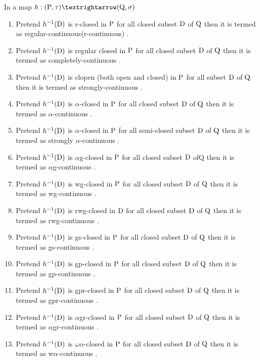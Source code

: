 \begin{dfn}\label{dfn1.3.1}
In a map $h: (\TSP, \tau) →(\TSQ, \sigma)$
\begin{enumerate}
\item Pretend $h^{-1}(\mathrm{D})$ is r-closed in $\mathrm{P}$ for all closed subset $\mathrm{D}$ of $\mathrm{Q}$ then it is termed as regular-continuous(r-continuous) \cite{key3} . 
\item Pretend $h^{-1}(\mathrm{D})$ is regular closed in $\mathrm{P}$ for all closed subset $\mathrm{D}$ of $\mathrm{Q}$ then it is termed as completely-continuous \cite{key3} . 
\item Pretend $h^{-1}(\mathrm{D})$ is clopen (both open and closed) in $\mathrm{P}$ for all subset $\mathrm{D}$ of $\mathrm{Q}$ then it is termed as strongly-continuous \cite{key26} . 
\item Pretend $h^{-1}(\mathrm{D})$ is $\alpha$-closed in $\mathrm{P}$ for all closed subset $\mathrm{D}$ of $\mathrm{Q}$ then it is termed as $\alpha$-continuous \cite{key14} . 
\item Pretend $h^{-1}(\mathrm{D})$ is $\alpha$-closed in $\mathrm{P}$ for all semi-closed subset $\mathrm{D}$ of $\mathrm{Q}$ then it is termed as strongly $\alpha$-continuous \cite{key32} . 
\item Pretend $h^{-1}(\mathrm{D})$ is $\alpha$g-closed in $\mathrm{P}$ for all closed subset $\mathrm{D}$ ofQ then it is termed as $\alpha$g-continuous \cite{key19} . 
\item Pretend $h^{-1}(\mathrm{D})$ is wg-closed in $\mathrm{P}$ for all closed subset $\mathrm{D}$ of $\mathrm{Q}$ then it is termed as wg-continuous \cite{key23} . 
\item Pretend $h^{-1}(\mathrm{D})$ is rwg-closed in $\mathrm{D}$ for all closed subset $\mathrm{D}$ of $\mathrm{Q}$ then it is termed as rwg-continuous \cite{key23} . 
\item Pretend $h^{-1}(\mathrm{D})$ is gs-closed in $\mathrm{P}$ for all closed subset $\mathrm{D}$ of $\mathrm{Q}$ then it is termed as gs-continuous \cite{key4} . 
\item Pretend $h^{-1}(\mathrm{D})$ is gp-closed in $\mathrm{P}$ for all closed subset $\mathrm{D}$ of $\mathrm{Q}$ then it is termed as gp-continuous \cite{key20} . 
\item Pretend $h^{-1}(\mathrm{D})$ is gpr-closed in $\mathrm{P}$ for all closed subset $\mathrm{D}$ of $\mathrm{Q}$ then it is termed as gpr-continuous \cite{key12} . 
\item Pretend $h^{-1}(\mathrm{D})$ is $\alpha$gr-closed in $\mathrm{P}$ for all closed subset $\mathrm{D}$ of $\mathrm{Q}$ then it is termed as $\alpha$gr-continuous \cite{key30} . 
\item Pretend $h^{-1}(\mathrm{D})$ is $\omega\alpha$-closed in $\mathrm{P}$ for all closed subset $\mathrm{D}$ of $\mathrm{Q}$ then it is termed as w$\alpha$-continuous \cite{key7} . 

\end{enumerate}
\end{dfn}

